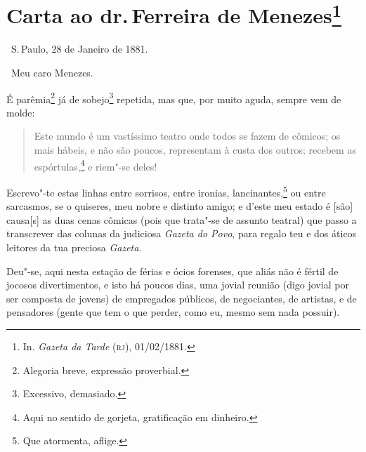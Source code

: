 \chapter{Carta ao dr.\,Ferreira de Menezes\footnote[*]{In.
  \emph{Gazeta da Tarde} (\textsc{rj}), 01/02/1881.}}

\hfill\ S.\,Paulo, 28 de Janeiro de 1881.\bigskip

\noindent\ Meu caro Menezes.\smallskip

É parêmia\footnote{Alegoria breve, expressão proverbial.} já de
sobejo\footnote{Excessivo, demasiado.} repetida, mas que, por muito
aguda, sempre vem de molde:

\begin{quote}
Este mundo é um vastíssimo teatro onde todos se fazem de cômicos; os
mais hábeis, e não são poucos, representam à custa dos outros; recebem
as espórtulas,\footnote{Aqui no sentido de gorjeta, gratificação em
  dinheiro.} e riem"-se deles!
\end{quote}

Escrevo"-te estas linhas entre sorrisos, entre ironias,
lancinantes,\footnote{Que atormenta, aflige.} ou entre sarcasmos, se o
quiseres, meu nobre e distinto amigo; e d'este meu estado é {[}são{]}
causa{[}s{]} as duas cenas cômicas (pois que trata"-se de assunto
teatral) que passo a transcrever das colunas da judiciosa \emph{Gazeta
do Povo}, para regalo teu e dos áticos leitores da tua preciosa
\emph{Gazeta}.

Deu"-se, aqui nesta estação de férias e ócios forenses, que aliás não é
fértil de jocosos divertimentos, e isto há poucos dias, uma jovial
reunião (digo jovial por ser composta de jovens) de empregados públicos,
de negociantes, de artistas, e de pensadores (gente que tem o que
perder, como eu, mesmo sem nada possuir).


